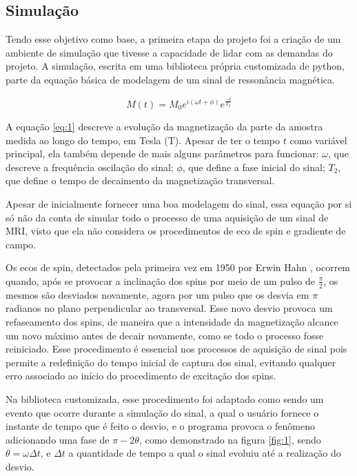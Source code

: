 \documentclass{article}
\begin{document}
\subsection{Simulação}

Tendo esse objetivo como base, a primeira etapa do projeto foi a criação de um ambiente de simulação
que tivesse a capacidade de lidar com as demandas do projeto. A simulação, escrita em uma biblioteca 
própria customizada de python, parte da equação básica de modelagem de um sinal de ressonância magnética.

\begin{equation} \label{eq:1}
    M(t) = M_0 e^{i(\omega t + \phi)} e^{\frac{-t}{T_2}}
\end{equation}

A equação \ref{eq:1} descreve a evolução da magnetização da parte da amostra medida ao longo do tempo, em Tesla (T). 
Apesar de ter o tempo $t$ como variável principal, ela também depende de mais alguns parâmetros para 
funcionar: $\omega$, que descreve a frequência oscilação do sinal; $\phi$, que define a fase inicial do 
sinal; $T_2$, que define o tempo de decaimento da magnetização transversal. 

Apesar de inicialmente fornecer uma boa modelagem do sinal, essa equação por si só não da conta de simular todo o processo de 
uma aquisição de um sinal de MRI, visto que ela não considera os procedimentos de eco de spin e gradiente de campo. 

Os ecos de spin, detectados pela primeira vez em 1950 por Erwin Hahn \cite{PhysRev.80.580}, ocorrem quando, após se provocar a 
inclinação dos spins por meio de um pulso de $\frac{\pi}{2}$, os mesmos são desviados novamente, agora por um pulso que os desvia em 
$\pi$ radianos no plano perpendicular ao transversal. Esse novo desvio provoca um refaseamento dos spins, de maneira que a intensidade
da magnetização alcance um novo máximo antes de decair novamente, como se todo o processo fosse reiniciado. Esse procedimento é 
essencial nos processos de aquisição de sinal pois permite a redefinição do tempo inicial de captura dos sinal, evitando qualquer erro 
associado ao início do procedimento de excitação dos spins.

Na biblioteca customizada, esse procedimento foi adaptado como sendo um evento que ocorre durante a simulação do sinal, a qual o 
usuário fornece o instante de tempo que é feito o desvio, e o programa provoca o fenômeno adicionando uma fase de $\pi - 2\theta$, 
como demonstrado na figura \ref{fig:1}, sendo $\theta = \omega \Delta t$, e $\Delta t$ a quantidade de tempo a qual o sinal evoluiu 
até a realização do desvio.   
\end{document}
